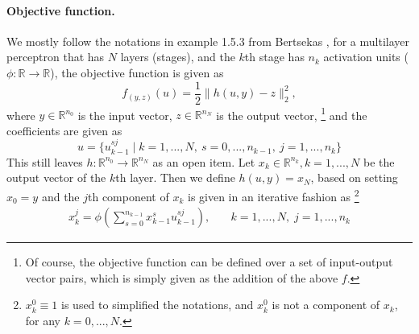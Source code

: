 \paragraph{Objective function.}
We mostly follow the notations in example 1.5.3 from Bertsekas \cite{bertsekas1999nonlinear}, for a multilayer perceptron that has $N$ layers (stages), and the $k$th stage has $n_k$ activation units ($\phi : \mathbb{R} \to \mathbb{R}$), the objective function is given as
\[f_{(y, z)}(u) = \frac{1}{2} \|h(u, y) - z\|_2^2,\]
where $y \in \mathbb{R}^{n_0}$ is the input vector, $z \in \mathbb{R}^{n_N}$ is the output vector,
\footnote{Of course, the objective function can be defined over a set of input-output vector pairs, which is simply given as the addition of the above $f$.}
and the coefficients are given as
\[u = \{ u_{k-1}^{sj} \; | \; k = 1,...,N, \: s = 0,...,n_{k-1}, \: j = 1,...,n_k\}\]
This still leaves $h : \mathbb{R}^{n_0} \to \mathbb{R}^{n_N}$ as an open item.
Let $x_k \in \mathbb{R}^{n_k}, k = 1,...,N$ be the output vector of the $k$th layer. Then we define $h(u, y) = x_N$, based on setting $x_0 = y$ and the $j$th component of $x_k$ is given in an iterative fashion as
\footnote{$x_k^0 \equiv 1$ is used to simplified the notations, and $x_k^0$ is not a component of $x_k$, for any $k = 0,...,N$.}
\[\begin{alignedat}{5}
    x_k^j = \phi \left( \sum_{s=0}^{n_{k-1}} x_{k-1}^s u_{k-1}^{sj} \right), &\quad k = 1,...,N, \; j = 1,...,n_k
\end{alignedat}\]

